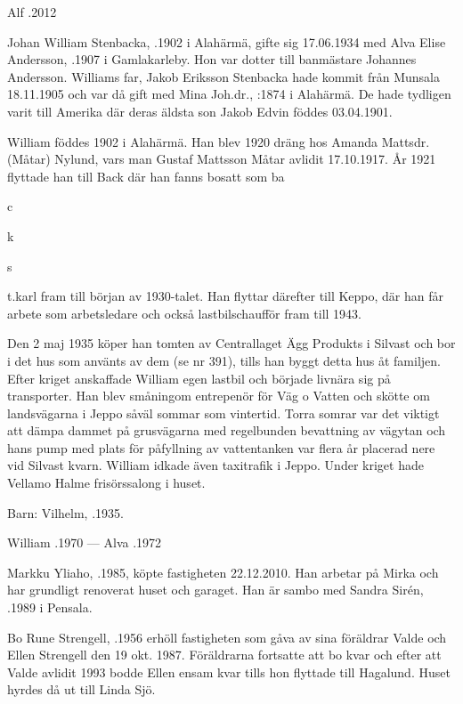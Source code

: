 Alf .2012


%
Johan William Stenbacka, .1902 i Alahärmä, gifte sig 17.06.1934 med Alva Elise Andersson, .1907 i Gamlakarleby. Hon var dotter till banmästare Johannes Andersson. Williams far, Jakob Eriksson Stenbacka hade kommit från Munsala 18.11.1905 och var då gift med Mina Joh.dr., :1874 i Alahärmä. De hade tydligen varit till Amerika där deras äldsta son Jakob Edvin föddes 03.04.1901.

William föddes 1902 i Alahärmä. Han blev 1920 dräng hos Amanda Mattsdr.(Måtar) Nylund, vars man Gustaf Mattsson Måtar avlidit 17.10.1917. År 1921 flyttade han till Back där han fanns bosatt som ba{c{k{s{t{}.karl fram till början av 1930-talet. Han flyttar därefter till Keppo, där han får arbete som arbetsledare och också lastbilschaufför fram till 1943.

Den 2 maj 1935 köper han tomten av Centrallaget Ägg Produkts i Silvast och bor i det hus som använts av dem (se nr 391), tills han byggt detta hus åt familjen. Efter kriget anskaffade William egen lastbil och började livnära sig på transporter. Han blev småningom entrepenör för Väg o Vatten och skötte om landsvägarna i Jeppo såväl sommar som vintertid. Torra somrar var det viktigt att dämpa dammet på grusvägarna med regelbunden bevattning av vägytan och hans pump med plats för påfyllning av vattentanken var flera år placerad nere vid Silvast kvarn. William idkade även taxitrafik i Jeppo. Under kriget hade Vellamo Halme frisörssalong i huset.

Barn:  Vilhelm, .1935.

William .1970  ---  Alva .1972



%



%
Markku Yliaho, .1985, köpte fastigheten 22.12.2010. Han arbetar på Mirka och har grundligt renoverat huset och garaget. Han är sambo med Sandra Sirén, .1989 i Pensala.


%
Bo Rune Strengell, .1956 erhöll fastigheten som gåva av sina föräldrar Valde och Ellen Strengell den 19 okt. 1987. Föräldrarna fortsatte att bo kvar och efter att Valde avlidit 1993 bodde Ellen ensam kvar tills hon flyttade till Hagalund. Huset hyrdes då ut till Linda Sjö.


}}}}
